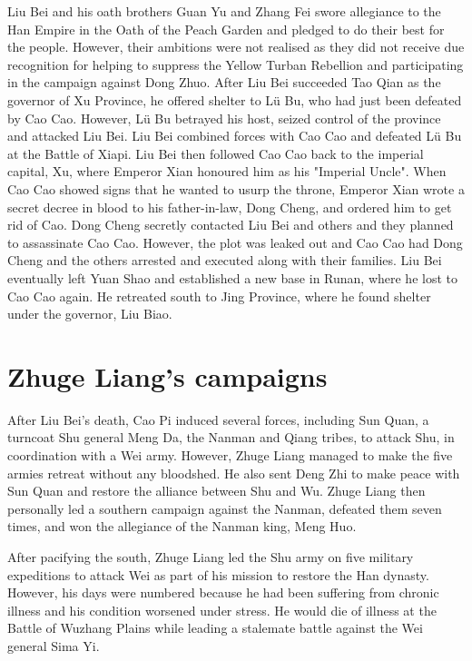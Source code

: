 Liu Bei and his oath brothers Guan Yu and Zhang Fei swore allegiance to the Han Empire in the Oath of the Peach Garden and pledged to do their best for the people. However, their ambitions were not realised as they did not receive due recognition for helping to suppress the Yellow Turban Rebellion and participating in the campaign against Dong Zhuo. After Liu Bei succeeded Tao Qian as the governor of Xu Province, he offered shelter to Lü Bu, who had just been defeated by Cao Cao. However, Lü Bu betrayed his host, seized control of the province and attacked Liu Bei. Liu Bei combined forces with Cao Cao and defeated Lü Bu at the Battle of Xiapi. Liu Bei then followed Cao Cao back to the imperial capital, Xu, where Emperor Xian honoured him as his "Imperial Uncle". When Cao Cao showed signs that he wanted to usurp the throne, Emperor Xian wrote a secret decree in blood to his father-in-law, Dong Cheng, and ordered him to get rid of Cao. Dong Cheng secretly contacted Liu Bei and others and they planned to assassinate Cao Cao. However, the plot was leaked out and Cao Cao had Dong Cheng and the others arrested and executed along with their families. Liu Bei eventually left Yuan Shao and established a new base in Runan, where he lost to Cao Cao again. He retreated south to Jing Province, where he found shelter under the governor, Liu Biao.

\section{Zhuge Liang's campaigns}
\label{sec:Zhuge Liang}

After Liu Bei's death, Cao Pi induced several forces, including Sun Quan, a turncoat Shu general Meng Da, the Nanman and Qiang tribes, to attack Shu, in coordination with a Wei army. However, Zhuge Liang managed to make the five armies retreat without any bloodshed. He also sent Deng Zhi to make peace with Sun Quan and restore the alliance between Shu and Wu. Zhuge Liang then personally led a southern campaign against the Nanman, defeated them seven times, and won the allegiance of the Nanman king, Meng Huo.

After pacifying the south, Zhuge Liang led the Shu army on five military expeditions to attack Wei as part of his mission to restore the Han dynasty. However, his days were numbered because he had been suffering from chronic illness and his condition worsened under stress. He would die of illness at the Battle of Wuzhang Plains while leading a stalemate battle against the Wei general Sima Yi.

